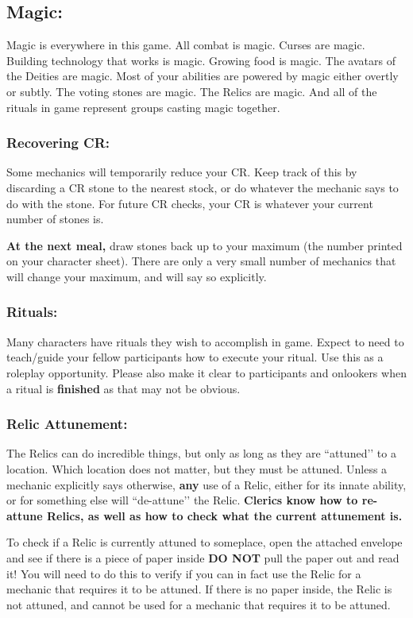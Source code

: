 \documentclass[sheet]{GL2020}
\begin{document}
\subsection{Magic:}
{Magic is everywhere in this game. All combat is magic. Curses are magic. Building technology that works is magic. Growing food is magic. The avatars of the Deities are magic. Most of your abilities are powered by magic either overtly or subtly. The voting stones are magic. The Relics are magic. And all of the rituals in game represent groups casting magic together.

\subsubsection{Recovering CR:}
Some mechanics will temporarily reduce your CR. Keep track of this by discarding a CR stone to the nearest stock, or do whatever the mechanic says to do with the stone. For future CR checks, your CR is whatever your current number of stones is.

\textbf{At the next meal,} draw stones back up to your maximum (the number printed on your character sheet). There are only a very small number of mechanics that will change your maximum, and will say so explicitly.

\subsubsection{Rituals:}
Many characters have rituals they wish to accomplish in game. Expect to need to teach/guide your fellow participants how to execute your ritual. Use this as a roleplay opportunity. Please also make it clear to participants and onlookers when a ritual is \textbf{finished} as that may not be obvious.

\subsubsection{Relic Attunement:}
The Relics can do incredible things, but only as long as they are ``attuned’’ to a location. Which location does not matter, but they must be attuned. Unless a mechanic explicitly says otherwise, \textbf{any} use of a Relic, either for its innate ability, or for something else will ``de-attune’’ the Relic. \textbf{Clerics know how to re-attune Relics, as well as how to check what the current attunement is.}

To check if a Relic is currently attuned to someplace, open the attached envelope and see if there is a piece of paper inside \textbf{DO NOT} pull the paper out and read it! You will need to do this to verify if you can in fact use the Relic for a mechanic that requires it to be attuned. If there is no paper inside, the Relic is not attuned, and cannot be used for a mechanic that requires it to be attuned.

}
\end{document}
